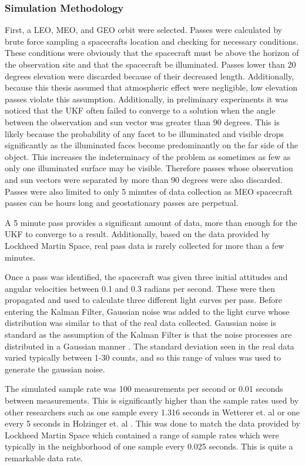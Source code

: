 \subsubsection{Simulation Methodology}
First, a LEO, MEO, and GEO orbit were selected. Passes were calculated by brute force sampling a spacecrafts location and checking for necessary conditions. These conditions were obviously that the spacecraft must be above the horizon of the observation site and that the spacecraft be illuminated. Passes lower than 20 degrees elevation were discarded because of their decreased length. Additionally, because this thesis assumed that atmospheric effect were negligible, low elevation passes violate this assumption. Additionally, in preliminary experiments it was noticed that the UKF often failed to converge to a solution when the angle between the observation and sun vector was greater than 90 degrees. This is likely because the probability of any facet to be illuminated and visible drops significantly as the illuminated faces become predominantly on the far side of the object. This increases the indeterminacy of the problem as sometimes as few as only one illuminated surface may be visible. Therefore passes whose observation and sun vectors were separated by more than 90 degrees were also discarded. Passes were also limited to only 5 minutes of data collection as MEO spacecraft passes can be hours long and geostationary passes are perpetual. 

A 5 minute pass provides a significant amount of data, more than enough for the UKF to converge to a result. Additionally, based on the data provided by Lockheed Martin Space, real pass data is rarely collected for more than a few minutes.

Once a pass was identified, the spacecraft was given three initial attitudes and angular velocities between 0.1 and 0.3 radians per second. These were then propagated and used to calculate three different light curves per pass. Before entering the Kalman Filter, Gaussian noise was added to the light curve whose distribution was similar to that of the real data collected. Gaussian noise is standard as the assumption of the Kalman Filter is that the noise processes are distributed in a Gaussian manner \cite{kf_kalman}. The standard deviation seen in the real data varied typically between 1-30 counts, and so this range of values was used to generate the gaussian noise.

The simulated sample rate was 100 measurements per second or 0.01 seconds between measurements. This is significantly higher than the sample rates used by other researchers such as one sample every 1.316 seconds in Wetterer et. al \cite{wetterer_ukf} or one every 5 seconds in Holzinger et. al \cite{Holzinger2012AttitudeEF}. This was done to match the data provided by Lockheed Martin Space which contained a range of sample rates which were typically in the neighborhood of one sample every 0.025 seconds. This is quite a remarkable data rate.

